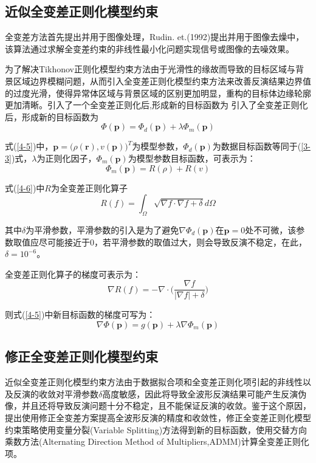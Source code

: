 \documentclass[12pt]{article}
\newcommand{\upcite}[1]{\textsuperscript{\textsuperscript{\cite{#1}}}}
\begin{document}
\subsection{近似全变差正则化模型约束}
全变差方法首先提出并用于图像处理，Rudin. et.(1992)提出并用于图像去燥中，该算法通过求解全变差约束的非线性最小化问题实现信号或图像的去噪效果。
\par
为了解决Tikhonov正则化模型约束方法由于光滑性的缘故而导致的目标区域与背景区域边界模糊问题，从而引入全变差正则化模型约束方法来改善反演结果边界值的过度光滑，使得异常体区域与背景区域的区别更加明显，重构的目标体边缘轮廓更加清晰。引入了一个全变差正则化后,形成新的目标函数为
引入了全变差正则化后，形成新的目标函数为
\begin{equation}\label{4-5}
\Phi(\boldsymbol{p})=\Phi_d(\boldsymbol{p})+\lambda\Phi_m(\boldsymbol{p})
\end{equation}
\par
式(\ref{4-5})中，$\boldsymbol{p}=\big(\rho(\boldsymbol{r}),v(\boldsymbol{p})\big)^T$为模型参数，$\Phi_d(\boldsymbol{p})$为数据目标函数等同于(\ref{3-3})式，$\lambda$为正则化因子，$\Phi_m(\boldsymbol{p})$为模型参数目标函数，可表示为：
\begin{equation}\label{4-6}
\Phi_m(\boldsymbol{p})=R(\rho)+R(v)
\end{equation}
\par
式(\ref{4-6})中$R$为全变差正则化算子
\begin{equation}\label{4-7}
R(f)=\int_\Omega \sqrt{\nabla f\cdot \nabla f+\delta}d\Omega
\end{equation}
\par
其中$\delta$为平滑参数，平滑参数的引入是为了避免$\nabla \Phi_d(\boldsymbol{p})$在$\boldsymbol{p}=0$处不可微，该参数取值应尽可能接近于0，若平滑参数的取值过大，则会导致反演不稳定，在此，$\delta=10^{-6}$。
\par
全变差正则化算子的梯度可表示为：
\begin{equation}\label{4-8}
\nabla R(f)=-\nabla \cdot \Big(\frac{\nabla f}{|\nabla f|+\delta}\Big)
\end{equation}
\par
则式(\ref{4-5})中新目标函数的梯度可写为：
\begin{equation}\label{4-9}
\nabla\Phi(\boldsymbol{p})=g(\boldsymbol{p})+\lambda\nabla\Phi_m(\boldsymbol{p})
\end{equation}
\subsection{修正全变差正则化模型约束}
近似全变差正则化模型约束方法由于数据拟合项和全变差正则化项引起的非线性以及反演的收敛对平滑参数$\delta$高度敏感，因此将导致全波形反演结果可能产生反演伪像，并且还将导致反演问题十分不稳定，且不能保证反演的收敛\upcite{Lin2014}。鉴于这个原因，提出使用修正全变差方案提高全波形反演的精度和收敛性，修正全变差正则化模型约束策略使用变量分裂(Variable Splitting)方法得到新的目标函数，使用交替方向乘数方法(Alternating Direction Method of Multipliers,ADMM)计算全变差正则化项。
\par
\end{document}
